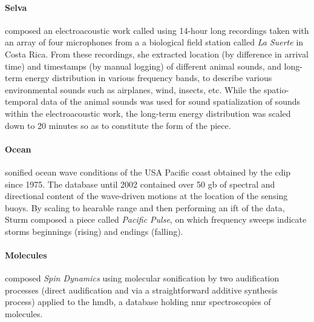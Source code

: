 \paragraph{Selva}
\textcite{icmc/bbp2372.2000.123} composed an electroacoustic work called  \parencite{Bar20:Viv} using 14-hour long recordings taken with an array of four microphones from a a biological field station called \textit{La Suerte} in Costa Rica. From these recordings, she extracted location (by difference in arrival time) and timestamps (by manual logging) of different animal sounds, and long-term energy distribution in various frequency bands, to describe various environmental sounds such as airplanes, wind, insects, etc. While the spatio-temporal data of the animal sounds was used for sound spatialization of sounds within the electroacoustic work, the long-term energy distribution was scaled down to 20 minutes so as to constitute the form of the piece.

\paragraph{Ocean}
\textcite{icmc/bbp2372.2002.056} sonified ocean wave conditions of the USA Pacific coast obtained by the \gls{cdip} since 1975. The database until 2002 contained over 50 \gls{gb} of spectral and directional content of the wave-driven motions at the location of the sensing buoys. By scaling to hearable range and then performing an \gls{ift} of the data, Sturm composed a piece called \textit{Pacific Pulse}, on which frequency sweeps indicate storms beginnings (rising) and endings (falling).

\paragraph{Molecules}
\textcite{icmc/bbp2372.2016.002} composed \textit{Spin Dynamics} using molecular sonification by two audification processes (direct audification and via a straightforward additive synthesis process) applied to the \gls{hmdb}, a database holding \gls{nmr} spectroscopies of molecules.



